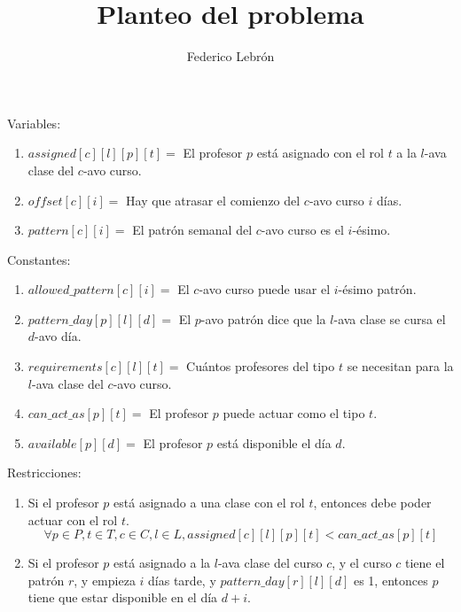 \documentclass[11pt]{amsart}
\title{Planteo del problema}
\author{Federico Lebrón}
\begin{document}
\maketitle


Variables:
\begin{enumerate}
\item $assigned[c][l][p][t] = $ El profesor $p$ está asignado con el rol $t$ a la $l$-ava clase del $c$-avo curso.
\item $offset[c][i] = $ Hay que atrasar el comienzo del $c$-avo curso $i$ días.
\item $pattern[c][i] = $ El patrón semanal del $c$-avo curso es el $i$-ésimo.
\end{enumerate}

Constantes:

\begin{enumerate}
\item $allowed\_pattern[c][i] = $ El $c$-avo curso puede usar el $i$-ésimo patrón.
\item $pattern\_day[p][l][d] = $ El $p$-avo patrón dice que la $l$-ava clase se cursa el $d$-avo día.
\item $requirements[c][l][t] = $ Cuántos profesores del tipo $t$ se necesitan para la $l$-ava clase del $c$-avo curso.
\item $can\_act\_as[p][t] = $ El profesor $p$ puede actuar como el tipo $t$.
\item $available[p][d] = $ El profesor $p$ está disponible el día $d$.
\end{enumerate}

Restricciones:

\begin{enumerate}
\item Si el profesor $p$ está asignado a una clase con el rol $t$, entonces debe poder actuar con el rol $t$.
$$
\forall p \in P, t \in T, c \in C, l \in L, assigned[c][l][p][t] < can\_act\_as[p][t]
$$

\item Si el profesor $p$ está asignado a la $l$-ava clase del curso $c$, y el curso $c$ tiene el patrón $r$, y empieza $i$ días tarde, y $pattern\_day[r][l][d]$ es 1, entonces $p$ tiene que estar disponible en el día $d + i$.
\end{enumerate}
\end{document}
